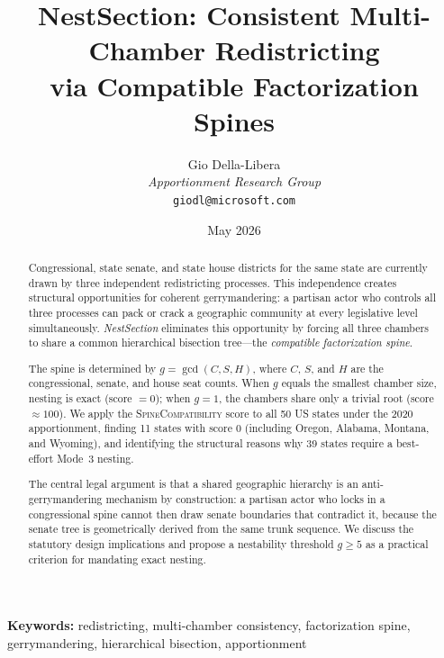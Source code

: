 \documentclass[12pt]{article}
\title{\textbf{NestSection: Consistent Multi-Chamber Redistricting\\
via Compatible Factorization Spines}}
\author{%
  Gio Della-Libera\\
  \textit{Apportionment Research Group}\\
  \small\texttt{giodl@microsoft.com}
}
\date{May 2026}
\theoremstyle{remark}
\renewcommand{\gcd}{\operatorname{gcd}}
\begin{document}
\maketitle

\begin{abstract}
Congressional, state senate, and state house districts for the same state are
currently drawn by three independent redistricting processes.  This independence
creates structural opportunities for coherent gerrymandering: a partisan actor
who controls all three processes can pack or crack a geographic community at
every legislative level simultaneously.  \emph{NestSection} eliminates this
opportunity by forcing all three chambers to share a common hierarchical
bisection tree---the \emph{compatible factorization spine}.

The spine is determined by $g = \gcd(C, S, H)$, where $C$, $S$, and $H$ are
the congressional, senate, and house seat counts.  When $g$ equals the smallest
chamber size, nesting is exact (score $= 0$); when $g = 1$, the chambers share
only a trivial root (score $\approx 100$).  We apply the
\textsc{SpineCompatibility} score to all 50 US states under the 2020
apportionment, finding 11 states with score 0 (including Oregon, Alabama,
Montana, and Wyoming), and identifying the structural reasons why 39 states
require a best-effort Mode~3 nesting.

The central legal argument is that a shared geographic hierarchy is an
anti-gerrymandering mechanism by construction: a partisan actor who locks in a
congressional spine cannot then draw senate boundaries that contradict it,
because the senate tree is geometrically derived from the same trunk sequence.
We discuss the statutory design implications and propose a nestability threshold
$g \geq 5$ as a practical criterion for mandating exact nesting.
\end{abstract}

\bigskip
\noindent\textbf{Keywords:} redistricting, multi-chamber consistency, factorization spine,
gerrymandering, hierarchical bisection, apportionment

\tableofcontents
\newpage










\end{document}
